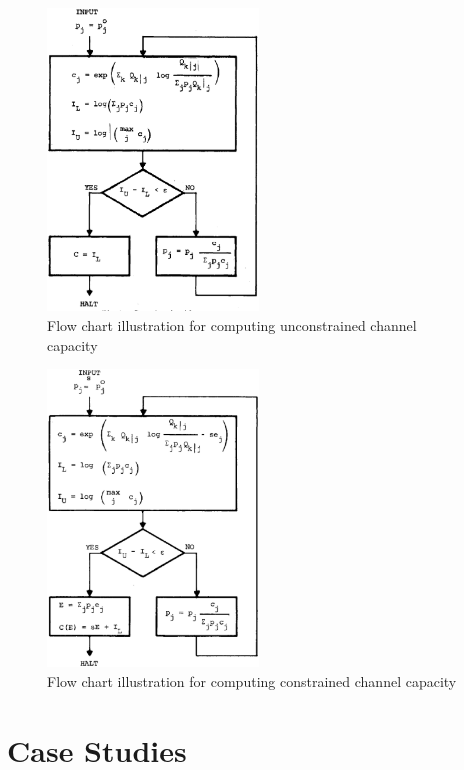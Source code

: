 \documentclass[a4paper,10pt]{article}
\begin{document}
\begin{figure}
 \centering
 \includegraphics[width=0.5\textwidth]{pic/unconstrained_cap.eps}
 \caption{Flow chart illustration for computing unconstrained channel capacity}
 \label{fig:unconstrained_cap}
\end{figure}
\begin{figure}
 \centering
 \includegraphics[width=0.5\textwidth]{pic/constrained_cap.eps}
 \caption{Flow chart illustration for computing constrained channel capacity}
 \label{fig:constrained_cap}
\end{figure}

\section{Case Studies}
\end{document}
